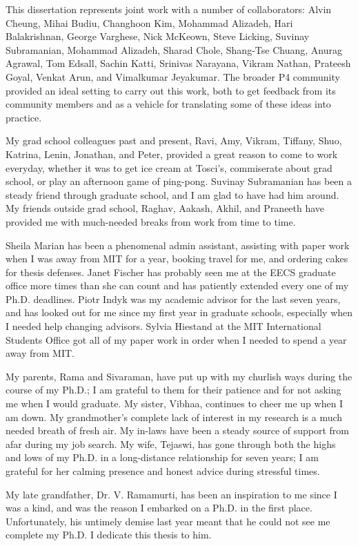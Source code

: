 This dissertation represents joint work with a number of collaborators: Alvin
Cheung, Mihai Budiu, Changhoon Kim, Mohammad Alizadeh, Hari Balakrishnan,
George Varghese, Nick McKeown, Steve Licking, Suvinay Subramanian, Mohammad
Alizadeh, Sharad Chole, Shang-Tse Chuang, Anurag Agrawal, Tom Edsall, Sachin
Katti, Srinivas Narayana, Vikram Nathan, Prateesh Goyal, Venkat Arun, and
Vimalkumar Jeyakumar. The broader P4 community provided an ideal setting to
carry out this work, both to get feedback from its community members and as a
vehicle for translating some of these ideas into practice. 

My grad school colleagues past and present, Ravi, Amy, Vikram, Tiffany, Shuo,
Katrina, Lenin, Jonathan, and Peter, provided a great reason to come to work
everyday, whether it was to get ice cream at Tosci's, commiserate about grad
school, or play an afternoon game of ping-pong.  Suvinay Subramanian has been a
steady friend through graduate school, and I am glad to have had him around. My
friends outside grad school, Raghav, Aakash, Akhil, and Praneeth have provided
me with much-needed breaks from work from time to time.

Sheila Marian has been a phenomenal admin assistant, assisting with paper work
when I was away from MIT for a year, booking travel for me, and ordering cakes
for thesis defenses. Janet Fischer has probably seen me at the EECS graduate
office more times than she can count and has patiently extended every one of my
Ph.D. deadlines. Piotr Indyk was my academic advisor for the last seven years,
and has looked out for me since my first year in graduate schools, especially
when I needed help changing advisors. Sylvia Hiestand at the MIT International
Students Office got all of my paper work in order when I needed to spend a year
away from MIT.

My parents, Rama and Sivaraman, have put up with my churlish ways during the
course of my Ph.D.; I am grateful to them for their patience and for not asking
me when I would graduate. My sister, Vibhaa, continues to cheer me up when I am
down.  My grandmother's complete lack of interest in my research is a much
needed breath of fresh air. My in-laws have been a steady source of support
from afar during my job search. My wife, Tejaswi, has gone through both the
highs and lows of my Ph.D. in a long-distance relationship for seven years; I
am grateful for her calming presence and honest advice during stressful times. 

My late grandfather, Dr. V. Ramamurti, has been an inspiration to me since I
was a kind, and was the reason I embarked on a Ph.D. in the first place.
Unfortunately, his untimely demise last year meant that he could not see me
complete my Ph.D. I dedicate this thesis to him.
